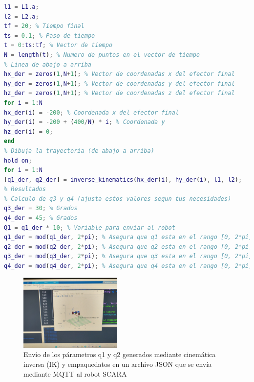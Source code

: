 \documentclass[final]{foresj}
\begin{document}
\begin{lstlisting}[language=Matlab]
% Longitudes de los eslabones, usadas en la cinematica inversa
l1 = L1.a;
l2 = L2.a;
tf = 20; % Tiempo final
ts = 0.1; % Paso de tiempo
t = 0:ts:tf; % Vector de tiempo
N = length(t); % Numero de puntos en el vector de tiempo
% Linea de abajo a arriba
hx_der = zeros(1,N+1); % Vector de coordenadas x del efector final
hy_der = zeros(1,N+1); % Vector de coordenadas y del efector final
hz_der = zeros(1,N+1); % Vector de coordenadas z del efector final
for i = 1:N
hx_der(i) = -200; % Coordenada x del efector final
hy_der(i) = -200 + (400/N) * i; % Coordenada y
hz_der(i) = 0;
end
% Dibuja la trayectoria (de abajo a arriba)
hold on;
for i = 1:N
[q1_der, q2_der] = inverse_kinematics(hx_der(i), hy_der(i), l1, l2);
% Resultados
% Calculo de q3 y q4 (ajusta estos valores segun tus necesidades)
q3_der = 30; % Grados
q4_der = 45; % Grados
Q1 = q1_der * 10; % Variable para enviar al robot
q1_der = mod(q1_der, 2*pi); % Asegura que q1 esta en el rango [0, 2*pi]
q2_der = mod(q2_der, 2*pi); % Asegura que q2 esta en el rango [0, 2*pi]
q3_der = mod(q3_der, 2*pi); % Asegura que q3 esta en el rango [0, 2*pi]
q4_der = mod(q4_der, 2*pi); % Asegura que q4 esta en el rango [0, 2*pi]
\end{lstlisting}

\begin{figure}[h!]
\centering
\includegraphics[width=0.45\textwidth]{SCARA6.jpg}
\caption{Envío de los párametros q1 y q2 generados mediante cinemática inversa (IK) y empaquedatos en un archivo JSON que se envía mediante MQTT al robot SCARA}
\label{fig:my_label}
\end{figure}
\end{document}
